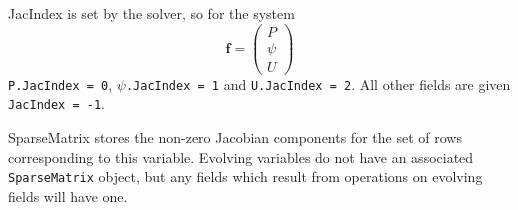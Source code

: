\documentclass[12pt]{article}
\newcommand{\code}[1]{\texttt{#1}}
\newcommand{\Vec}[1]{\ensuremath{\mathbf{#1}}}
\begin{document}
JacIndex is set by the solver, so for the system
\[
\Vec{f} = \left(\begin{array}{c}
P \\
\psi \\
U
\end{array}\right)
\]
\code{P.JacIndex = 0}, \code{$\psi$.JacIndex = 1} and \code{U.JacIndex = 2}.
All other fields are given \code{JacIndex = -1}. 

SparseMatrix stores the non-zero Jacobian components for the set of rows
corresponding to this variable. Evolving variables do not have an associated
\code{SparseMatrix} object, but any fields which result from operations on
evolving fields will have one.




\end{document}
